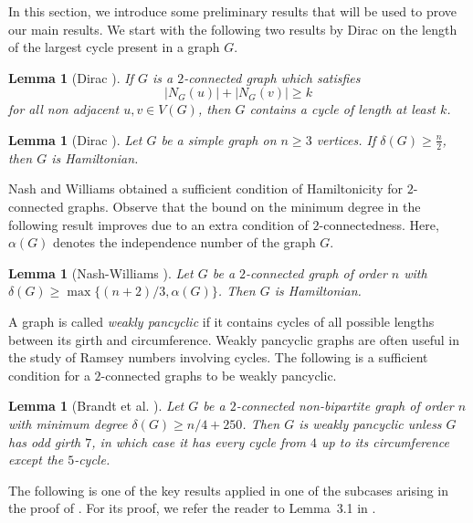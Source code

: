 \documentclass[12pt]{article}
\newtheorem{lemma}[theorem]{Lemma}
\theoremstyle{definition}
\begin{document}
In this section, we introduce some preliminary results that will be used to prove our main results. We start with the following two results by Dirac \cite{dirac} on the length of the largest cycle present in a graph $G$.

\begin{lemma}[Dirac \cite{dirac}]\label{Dirac}
    If $G$ is a $2$-connected graph which satisfies $$|N_G(u)|+|N_G(v)|\geq k$$ for all non adjacent $u,v\in V(G)$, then $G$ contains a cycle of length at least $k$.
\end{lemma}



\begin{lemma}[Dirac \rm\cite{dirac}]\label{Dirac_2}
Let $G$ be a simple graph on $n \geq 3$ vertices. If $\delta(G) \geq \frac{n}{2}$, then $G$ is Hamiltonian.
\end{lemma}

Nash and Williams obtained a sufficient condition of Hamiltonicity for $2$-connected graphs. Observe that the bound on the minimum degree in the following result improves  due to an extra condition of $2$-connectedness. Here, $\alpha(G)$ denotes the independence number of the graph $G$.

\begin{lemma}[Nash-Williams \cite{nash1971Hamiltonian}]\label{Thm:Nash-william}
    Let $G$ be a $2$-connected graph of order $n$ with $\delta(G)\geq \max\{(n+2)/3,\alpha(G)\}$. Then $G$ is Hamiltonian.
\end{lemma}

 A graph is called \emph{weakly pancyclic} if it contains cycles of all possible lengths between its girth and circumference. Weakly pancyclic graphs are often useful in the study of Ramsey numbers involving cycles. The following is a sufficient condition for a $2$-connected graphs to be weakly pancyclic.
 
\begin{lemma}[Brandt et al. \cite{brandt1998weakly}]\label{Thm:Weakpan-Brandt_nby4_250_1}
    Let $G$ be a $2$-connected non-bipartite graph of order $n$ with minimum degree $\delta(G) \geq  n/4 + 250$. Then $G$ is weakly pancyclic unless $G$ has odd girth $7$, in which case it has every cycle from $4$ up to its circumference except the $5$-cycle.
\end{lemma}

The following is one of the key results applied in one of the subcases arising in the proof of . For its proof, we refer the reader to Lemma~3.1 in \cite{dewan2026ramsey}.
\end{document}
